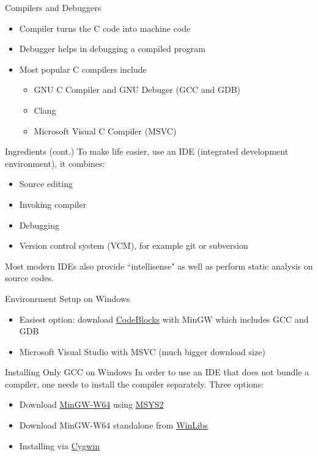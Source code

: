 \documentclass[12pt, aspectratio=169]{beamer}
\begin{document}
    \begin{frame}{Compilers and Debuggers}
        \begin{itemize}
            \item Compiler turns the C code into machine code
            \item Debugger helps in debugging a compiled program
            \item Most popular C compilers include
            \begin{itemize}
                \item GNU C Compiler and GNU Debuger (GCC and GDB)
                \item Clang
                \item Microsoft Visual C Compiler (MSVC)
            \end{itemize}
        \end{itemize}
    \end{frame}

    \begin{frame}{Ingredients (cont.)}
        To make life easier, use an IDE (integrated development environment), it combines:
        \begin{itemize}
            \item Source editing
            \item Invoking compiler
            \item Debugging
            \item Version control system (VCM), for example git or subversion
        \end{itemize}

        Most modern IDEs also provide ``intellisense" as well as perform static analysis on source codes.
    \end{frame}

    \begin{frame}{Environrment Setup on Windows}
        \begin{itemize}
            \item Easiest option: download \href{https://www.codeblocks.org/downloads/binaries/}{CodeBlocks} with MinGW which includes GCC and GDB
            \item Microsoft Visual Studio with MSVC (much bigger download size)
        \end{itemize}
    \end{frame}

    \begin{frame}{Installing Only GCC on Windows}
        In order to use an IDE that does not bundle a compiler, one needs to install the compiler separately. Three options:
        \begin{itemize}
            \item Download \href{https://www.mingw-w64.org/}{MinGW-W64} using \href{https://www.msys2.org/}{MSYS2}
            \item Download MinGW-W64 standalone from \href{https://winlibs.com/}{WinLibs}
            \item Installing via \href{https://www.cygwin.com/}{Cygwin}
        \end{itemize}
    \end{frame}
\end{document}
